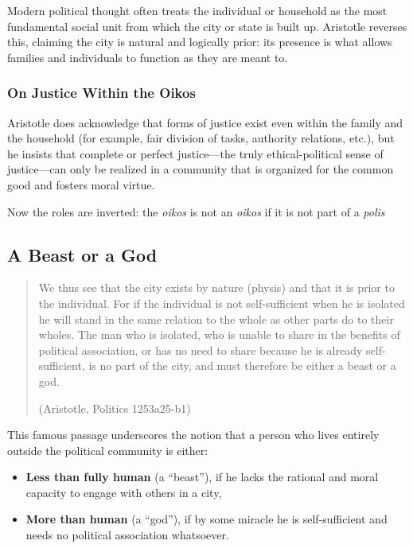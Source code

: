                         Modern political thought often treats the individual or household as the most fundamental social unit from which the city or state is built up. Aristotle reverses this, claiming the city is natural and logically prior: its presence is what allows families and individuals to function as they are meant to.

                    \subsubsection{On Justice Within the Oikos}

                        Aristotle does acknowledge that forms of justice exist even within the family and the household (for example, fair division of tasks, authority relations, etc.), but he insists that complete or perfect justice—the truly ethical-political sense of justice—can only be realized in a community that is organized for the common good and fosters moral virtue.

                \begin{remark}
                    Now the roles are inverted: the \textit{oikos} is not an \textit{oikos} if it is not part of a \textit{polis}
                \end{remark}

            \subsection{A Beast or a God}

                \begin{quote}
                    We thus see that the city exists by nature (physis) and that it is prior to the individual. For if the individual is not self-sufficient when he is isolated he will stand in the same relation to the whole as other parts do to their wholes. The man who is isolated, who is unable to share in the benefits of political association, or has no need to share because he is already self-sufficient, is no part of the city, and must therefore be either a beast or a god. 

                    (Aristotle, Politics 1253a25-b1)
                \end{quote}

                    This famous passage underscores the notion that a person who lives entirely outside the political community is either:

                    \begin{itemize}
                        \item \textbf{Less than fully human} (a “beast”), if he lacks the rational and moral capacity to engage with others in a city,
                        \item \textbf{More than human} (a “god”), if by some miracle he is self-sufficient and needs no political association whatsoever.
                    \end{itemize}

